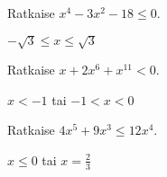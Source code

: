\begin{tehtavasivu}
\begin{tehtava}
    Ratkaise $x^4-3x^2-18 \le 0$.
    \begin{vastaus}
    $-\sqrt{3}\le x \le \sqrt{3}$
    \end{vastaus}
\end{tehtava}

\begin{tehtava}
    Ratkaise $x+2x^6+x^{11}<0$.
    \begin{vastaus}
    $x<-1$ tai $ -1<x<0$
    \end{vastaus}
\end{tehtava}

\begin{tehtava}
    Ratkaise $4 x^5+9 x^3 \le 12 x^4$.
    \begin{vastaus}
    $x\le0$ tai $x=\frac{2}{3}$
    \end{vastaus}
\end{tehtava}

\end{tehtavasivu}

